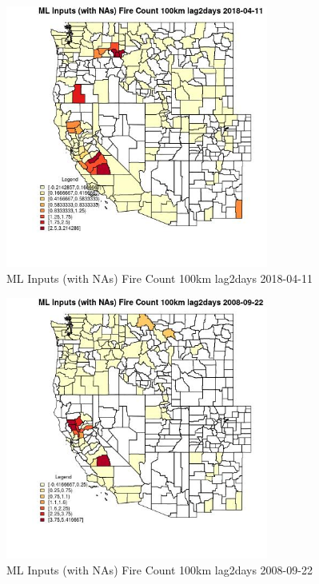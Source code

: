 \begin{figure} 
\centering  
\includegraphics[width=0.77\textwidth]{Code_Outputs/Report_ML_input_PM25_Step4_part_e_de_duplicated_aves_compiled_2019-05-18wNAs_CountyFire_Count_100km_lag2daysMean2018-04-11.jpg} 
\caption{\label{fig:Report_ML_input_PM25_Step4_part_e_de_duplicated_aves_compiled_2019-05-18wNAsCountyFire_Count_100km_lag2daysMean2018-04-11}ML Inputs (with NAs) Fire Count 100km lag2days 2018-04-11} 
\end{figure} 
 

\begin{figure} 
\centering  
\includegraphics[width=0.77\textwidth]{Code_Outputs/Report_ML_input_PM25_Step4_part_e_de_duplicated_aves_compiled_2019-05-18wNAs_CountyFire_Count_100km_lag2daysMean2008-09-22.jpg} 
\caption{\label{fig:Report_ML_input_PM25_Step4_part_e_de_duplicated_aves_compiled_2019-05-18wNAsCountyFire_Count_100km_lag2daysMean2008-09-22}ML Inputs (with NAs) Fire Count 100km lag2days 2008-09-22} 
\end{figure} 
 

